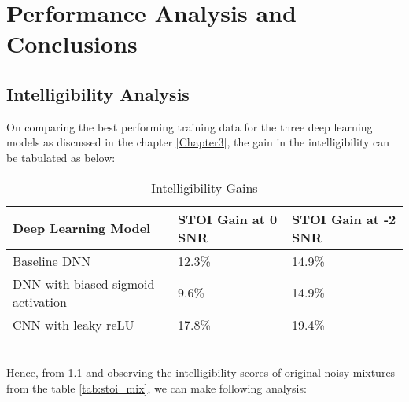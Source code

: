 \chapter{Performance Analysis and Conclusions} %

\label{Chapter4} %


\section{Intelligibility Analysis}
On comparing the best performing training data for the three deep learning models as discussed in the chapter \ref{Chapter3}, the gain in the intelligibility can be tabulated as below:\\
\begin{table}[!htbp]
\centering
\begin{tabular}{|p{8cm}|p{4cm}|p{4cm}|}
\hline
\textbf{Deep Learning Model} & \textbf{STOI Gain at 0 SNR} & \textbf{STOI Gain at -2 SNR}\\
\hline
Baseline DNN & 12.3\% & 14.9\%\\
\hline
DNN with biased sigmoid activation & 9.6\% & 14.9\%\\
\hline
CNN with leaky reLU & 17.8\% & 19.4\%\\
\hline
\end{tabular}
\caption{Intelligibility Gains}
\label{tab:i_gain_compare}
\end{table}
\\
Hence, from \ref{tab:i_gain_compare} and observing the intelligibility scores of original noisy mixtures from the table \ref{tab:stoi_mix}, we can make following analysis:\\
